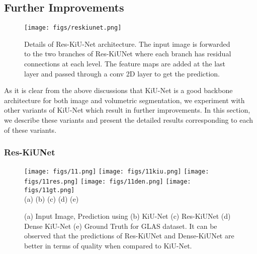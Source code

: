 \documentclass[journal,twoside,web]{ieeecolor}
\begin{document}
\subsection{Further Improvements}

\begin{figure}[htbp]
	\centering
	\texttt{[image: figs/reskiunet.png]}\\
	
	
	\caption{Details of Res-KiU-Net architecture. The input image is forwarded to the two branches of Res-KiUNet where each branch has residual connections at each level. The feature maps are added at the last layer and passed through a  conv 2D layer to get the prediction.}
	\label{reskiu}
	
\end{figure}

As it is clear from the above discussions that KiU-Net is a good backbone architecture for both image and volumetric segmentation, we  experiment with other variants of KiU-Net which result in further improvements. In this section, we describe these variants and present the detailed results corresponding to each of these variants. 





\subsubsection{Res-KiUNet}

\begin{figure}[b]
	\begin{center}
		\centering
		\texttt{[image: figs/11.png]}
		\texttt{[image: figs/11kiu.png]}
		\texttt{[image: figs/11res.png]}
		\texttt{[image: figs/11den.png]}
		\texttt{[image: figs/11gt.png]} \\
		(a) \hskip37pt (b) \hskip37pt (c) \hskip37pt(d) \hskip37pt (e)
		\caption{(a) Input Image, Prediction using (b) KiU-Net (c) Res-KiUNet (d) Dense KiU-Net (e) Ground Truth for GLAS dataset. It can be observed that the predictions of Res-KiUNet and Dense-KiUNet are better in terms of quality when compared to KiU-Net.    }
		\label{resden}
	\end{center}
\end{figure}
\end{document}
